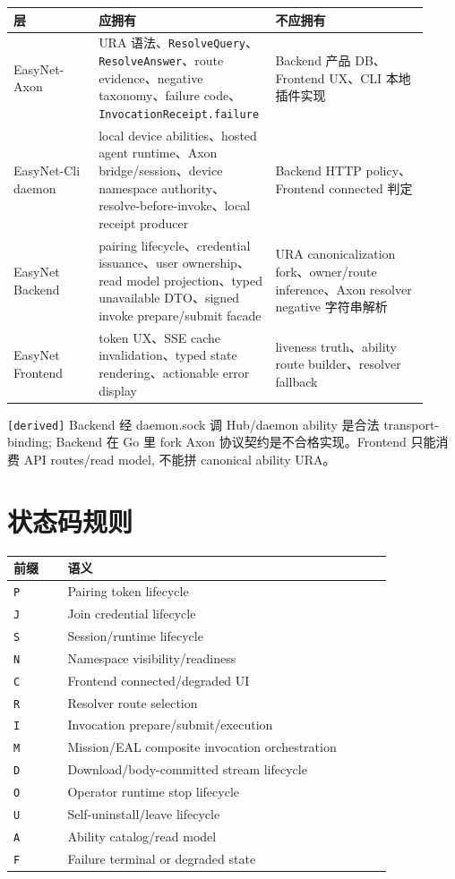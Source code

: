 \documentclass[11pt]{article}
\newcommand{\tagderived}{\textcolor{axongreen}{\texttt{[derived]}}}
\newcommand{\code}[1]{\texttt{#1}}
\begin{document}
\begin{longtable}{L{0.20\linewidth} L{0.36\linewidth} L{0.36\linewidth}}
\toprule
层 & 应拥有 & 不应拥有 \\
\midrule
EasyNet-Axon & URA 语法、\code{ResolveQuery}、\code{ResolveAnswer}、route evidence、negative taxonomy、failure code、\code{InvocationReceipt.failure} & Backend 产品 DB、Frontend UX、CLI 本地插件实现 \\
EasyNet-Cli daemon & local device abilities、hosted agent runtime、Axon bridge/session、device namespace authority、resolve-before-invoke、local receipt producer & Backend HTTP policy、Frontend connected 判定 \\
EasyNet Backend & pairing lifecycle、credential issuance、user ownership、read model projection、typed unavailable DTO、signed invoke prepare/submit facade & URA canonicalization fork、owner/route inference、Axon resolver negative 字符串解析 \\
EasyNet Frontend & token UX、SSE cache invalidation、typed state rendering、actionable error display & liveness truth、ability route builder、resolver fallback \\
\bottomrule
\end{longtable}

\begin{decisionbox}
\tagderived{} Backend 经 daemon.sock 调 Hub/daemon ability 是合法 transport-binding; Backend 在 Go 里 fork Axon 协议契约是不合格实现。Frontend 只能消费 API routes/read model, 不能拼 canonical ability URA。
\end{decisionbox}

\section{状态码规则}

\begin{longtable}{L{0.12\linewidth} L{0.72\linewidth}}
\toprule
前缀 & 语义 \\
\midrule
\code{P} & Pairing token lifecycle \\
\code{J} & Join credential lifecycle \\
\code{S} & Session/runtime lifecycle \\
\code{N} & Namespace visibility/readiness \\
\code{C} & Frontend connected/degraded UI \\
\code{R} & Resolver route selection \\
\code{I} & Invocation prepare/submit/execution \\
\code{M} & Mission/EAL composite invocation orchestration \\
\code{D} & Download/body-committed stream lifecycle \\
\code{O} & Operator runtime stop lifecycle \\
\code{U} & Self-uninstall/leave lifecycle \\
\code{A} & Ability catalog/read model \\
\code{F} & Failure terminal or degraded state \\
\bottomrule
\end{longtable}
\end{document}
